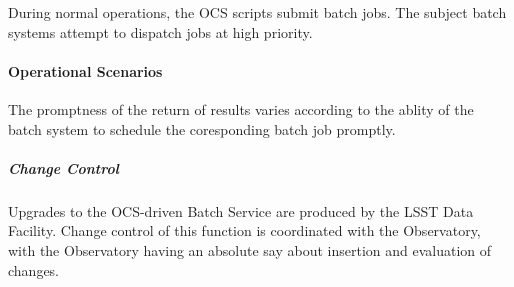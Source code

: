 During normal operations, the OCS scripts submit batch jobs. The subject batch systems attempt to dispatch jobs at high priority.

\paragraph{Operational Scenarios}

The promptness of the return of results varies according to the ablity
of the batch system to schedule the coresponding batch job promptly.

\subparagraph{Change Control}

Upgrades to the OCS-driven Batch Service are produced by the LSST Data Facility. Change control
of this function is coordinated with the Observatory, with the Observatory having an absolute say
about insertion and evaluation of changes.

